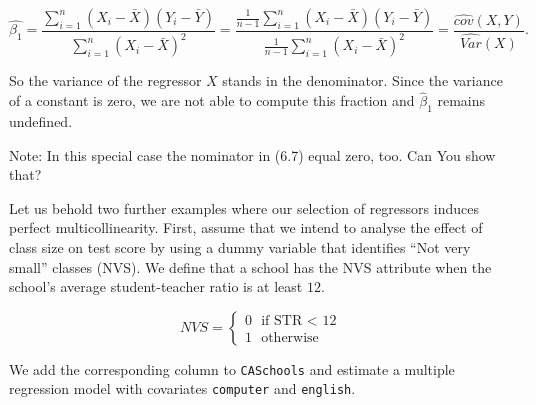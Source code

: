 \documentclass[]{book}
\newenvironment{Shaded}{\begin{snugshade}}{\end{snugshade}}
\newcommand{\KeywordTok}[1]{\textcolor[rgb]{0.13,0.29,0.53}{\textbf{#1}}}
\newcommand{\DataTypeTok}[1]{\textcolor[rgb]{0.13,0.29,0.53}{#1}}
\newcommand{\DecValTok}[1]{\textcolor[rgb]{0.00,0.00,0.81}{#1}}
\newcommand{\StringTok}[1]{\textcolor[rgb]{0.31,0.60,0.02}{#1}}
\newcommand{\CommentTok}[1]{\textcolor[rgb]{0.56,0.35,0.01}{\textit{#1}}}
\newcommand{\OperatorTok}[1]{\textcolor[rgb]{0.81,0.36,0.00}{\textbf{#1}}}
\newcommand{\NormalTok}[1]{#1}
\theoremstyle{definition}
\theoremstyle{definition}
\theoremstyle{definition}
\theoremstyle{remark}
\begin{document}
\[ \hat{\beta_1} =  \frac{\sum_{i = 1}^n (X_i - \bar{X})(Y_i - \bar{Y})} { \sum_{i=1}^n (X_i - \bar{X})^2} = \frac{\frac{1}{n-1} \sum_{i = 1}^n (X_i - \bar{X})(Y_i - \bar{Y})} {\frac{1}{n-1} \sum_{i=1}^n (X_i - \bar{X})^2} = \frac{\widehat{cov}(X,Y)}{\widehat{Var}(X)}. \tag{6.7} \]

So the variance of the regressor \(X\) stands in the denominator. Since
the variance of a constant is zero, we are not able to compute this
fraction and \(\hat{\beta}_1\) remains undefined.

Note: In this special case the nominator in (6.7) equal zero, too. Can
You show that?

Let us behold two further examples where our selection of regressors
induces perfect multicollinearity. First, assume that we intend to
analyse the effect of class size on test score by using a dummy variable
that identifies ``Not very small'' classes (NVS). We define that a
school has the NVS attribute when the school's average student-teacher
ratio is at least \(12\).

\[ NVS = \begin{cases} 0 \ \ \ \text{if STR < 12} \\ 1 \ \ \ \text{otherwise} \end{cases} \]

We add the corresponding column to \texttt{CASchools} and estimate a
multiple regression model with covariates \texttt{computer} and
\texttt{english}.

\begin{Shaded}
\end{Shaded}
\end{document}
